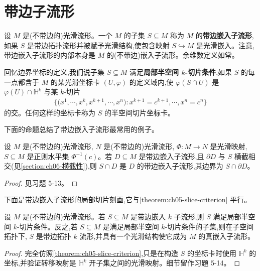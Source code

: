 \documentclass[../../main.tex]{subfiles}
\begin{document}
\section{带边子流形}\label{section:ch05-带边子流形}

设 $M$ 是(不带边的)光滑流形。一个 $M$ 的子集 $S\subseteq M$ 称为 $M$ 的\textbf{带边嵌入子流形},如果 $S$ 是带边拓扑流形并被赋予光滑结构,使包含映射 $S\hookrightarrow M$ 是光滑嵌入。注意,带边嵌入子流形的内部本身是 $M$ 的(不带边)嵌入子流形。余维数定义如常。

回忆边界坐标的定义,我们说子集 $S\subseteq M$ 满足\textbf{局部半空间 $k$-切片条件},如果 $S$ 的每一点都含于 $M$ 的某光滑坐标卡 $(U,\varphi)$ 的定义域内,使 $\varphi(S\cap U)$ 是 $\varphi(U)\cap\mathbb{H}^k$ 与某 $k$-切片
\begin{align*}
\bigl\{\bigl(x^1,\cdots ,x^k,x^{k+1},\cdots ,x^n\bigr):x^{k+1}=c^{k+1},\cdots ,x^n=c^n\bigr\}
\end{align*}
的交。任何这样的坐标卡称为 $S$ 的半空间切片坐标卡。

下面的命题总结了带边嵌入子流形最常用的例子。

\begin{proposition}\label{proposition:ch05-level-sets-boundary}
设 $M$ 是(不带边的)光滑流形, $N$ 是(不带边的)光滑流形, $\Phi:M\to N$ 是光滑映射, $S\subseteq M$ 是正则水平集 $\Phi^{-1}(c)$。若 $D\subseteq M$ 是带边嵌入子流形,且 $\partial D$ 与 $S$ 横截相交(见\cref{section:ch06-横截性}),则 $S\cap D$ 是 $D$ 的带边嵌入子流形,其边界为 $S\cap\partial D$。
\end{proposition}

\begin{proof}
见习题 5-13。
\end{proof}

下面是带边嵌入子流形的局部切片刻画,它与\cref{theorem:ch05-slice-criterion} 平行。

\begin{theorem}\label{theorem:ch05-slice-boundary}
设 $M$ 是(不带边的)光滑流形。若 $S\subseteq M$ 是带边嵌入 $k$ 子流形,则 $S$ 满足局部半空间 $k$-切片条件。反之,若 $S\subseteq M$ 是满足局部半空间 $k$-切片条件的子集,则在子空间拓扑下, $S$ 是带边拓扑 $k$ 流形,并具有一个光滑结构使它成为 $M$ 的真嵌入子流形。
\end{theorem}

\begin{proof}
完全仿照\cref{theorem:ch05-slice-criterion},只是在构造 $S$ 的坐标卡时使用 $\mathbb{H}^k$ 的坐标,并验证转移映射是 $\mathbb{H}^k$ 开子集之间的光滑映射。细节留作习题 5-14。
\end{proof}
\end{document}
